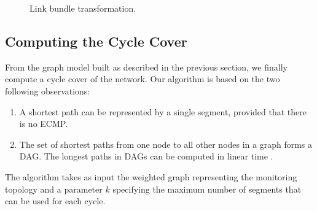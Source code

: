 \begin{figure}
\begin{center}
\end{center}
\caption{Link bundle transformation.}
\label{fig:bundle}
\end{figure}

\subsection{Computing the Cycle Cover}

From the graph model built as described in the previous section, we finally compute a cycle cover of the network.
Our algorithm is based on the two following observations:

\begin{enumerate}
 \item A shortest path can be represented by a single segment, provided that there
 is no ECMP.
 \item The set of shortest paths from one node to all other nodes in a graph forms
 a DAG. The longest paths in DAGs can be computed in linear
 time \cite{sedgewick2011algorithms}. %
\end{enumerate}

The algorithm takes as input the weighted graph representing the monitoring
topology and a parameter $k$ specifying the maximum number of segments that
can be used for each cycle.

